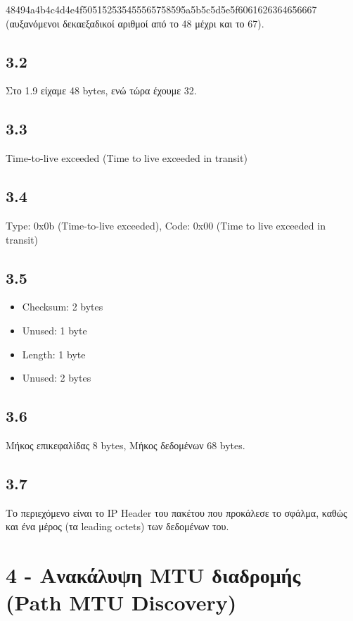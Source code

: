 			48494a4b4c4d4e4f505152535455565758595a5b5c5d5e5f6061626364656667 \\
			
			(αυξανόμενοι δεκαεξαδικοί αριθμοί από το 48 μέχρι και το 67).
	
		\subsection*{3.2}
			Στο 1.9 είχαμε 48 bytes, ενώ τώρα έχουμε 32.
	
		\subsection*{3.3}
			Time-to-live exceeded (Time to live exceeded in transit)
	
		\subsection*{3.4}
			Type: 0x0b (Time-to-live exceeded), Code: 0x00 (Time to live exceeded in transit)
	
		\subsection*{3.5}
			\begin{itemize}
				\item Checksum: 2 bytes
				\item Unused: 1 byte
				\item Length: 1 byte
				\item Unused: 2 bytes
			\end{itemize}
			
		\subsection*{3.6}
			Μήκος επικεφαλίδας 8 bytes, Μήκος δεδομένων 68 bytes.
	
		\subsection*{3.7}
			Το περιεχόμενο είναι το IP Header του πακέτου που προκάλεσε το σφάλμα, καθώς και ένα μέρος (τα leading octets) των δεδομένων του. 

	\section*{4 - Ανακάλυψη MTU διαδρομής (Path MTU Discovery)}

